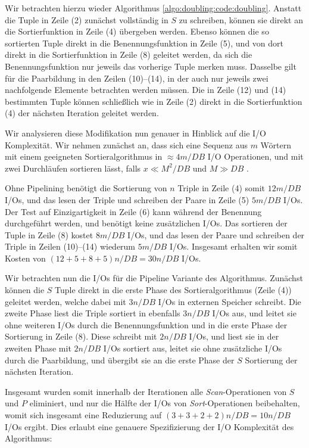 Wir betrachten hierzu wieder Algorithmus \ref{algo:doubling:code:doubling}. Anstatt die Tuple in Zeile (2) zunächst vollständig in $S$ zu schreiben, können sie direkt an die Sortierfunktion in Zeile (4) übergeben werden. Ebenso können die so sortierten Tuple direkt in die Benennungsfunktion in Zeile (5), und von dort direkt in die Sortierfunktion in Zeile (8) geleitet werden, da sich die Benennungsfunktion nur jeweils das vorherige Tuple merken muss. Dasselbe gilt für die Paarbildung in den Zeilen (10)--(14), in der auch nur jeweils zwei nachfolgende Elemente betrachten werden müssen. Die in Zeile (12) und (14) bestimmten Tuple können schließlich wie in Zeile (2) direkt in die Sortierfunktion (4) der nächsten Iteration geleitet werden.

Wir analysieren diese Modifikation nun genauer in Hinblick auf die I/O Komplexität. Wir nehmen zunächst an, dass sich eine Sequenz aus $m$ Wörtern mit einem geeigneten Sortieralgorithmus in $\approx 4m/DB$ I/O Operationen, und mit zwei Durchläufen sortieren lässt, falls $x \ll M^2/DB$ und $M \gg DB$ \cite{Aggarwal1988}.

Ohne Pipelining benötigt die Sortierung von $n$ Triple in Zeile (4) somit $12m/DB$ I/Os, und das lesen der Triple und schreiben der Paare in Zeile (5) $5m/DB$ I/Os. Der Test auf Einzigartigkeit in Zeile (6) kann während der Benennung durchgeführt werden, und benötigt keine zusätzlichen I/Os. Das sortieren der Tuple in Zeile (8) kostet $8m/DB$ I/Os, und das lesen der Paare und schreiben der Triple in Zeilen (10)--(14) wiederum  $5m/DB$ I/Os. Insgesamt erhalten wir somit Kosten von $(12 + 5 + 8 +5)n/DB = 30n/DB$ I/Os.

Wir betrachten nun die I/Os für die Pipeline Variante des Algorithmus. Zunächst können die $S$ Tuple direkt in die erste Phase des Sortieralgorithmus (Zeile (4)) geleitet werden, welche dabei mit $3n/DB$ I/Os in externen Speicher schreibt. Die zweite Phase liest die Triple sortiert in ebenfalls $3n/DB$ I/Os aus, und leitet sie ohne weiteren I/Os durch die Benennungsfunktion und in die erste Phase der Sortierung in Zeile (8). Diese schreibt mit $2n/DB$ I/Os, und liest sie in der zweiten Phase mit $2n/DB$ I/Os sortiert aus, leitet sie ohne zusätzliche I/Os durch die Paarbildung, und übergibt sie an die erste Phase der $S$ Sortierung der nächsten Iteration. 

Insgesamt wurden somit innerhalb der Iterationen alle \textit{Scan}-Operationen von $S$ und $P$ eliminiert, und nur die Hälfte der I/Os von \textit{Sort}-Operationen beibehalten, womit sich insgesamt eine Reduzierung auf $(3 + 3 + 2 + 2)n/DB = 10n/DB$ I/Os ergibt. Dies erlaubt eine genauere Spezifizierung der I/O Komplexität des Algorithmus:


